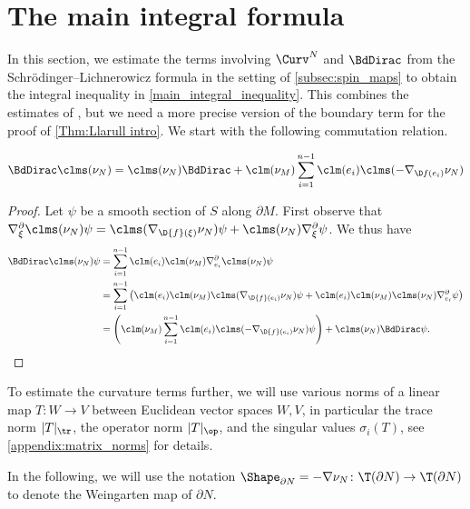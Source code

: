 \documentclass[a4paper,11pt]{amsart}
\numberwithin{equation}{section}
\begin{document}
\section{The main integral formula}\label{sec:integral_formula}

 
In this section, we estimate the terms involving \(\Curv^N\) and \(\BdDirac\) from the Schr\"odinger--Lichnerowicz formula  in the setting of \cref{subsec:spin_maps} to obtain the integral inequality in \cref{main_integral_inequality}.
This combines the estimates of \textcite{GoetteSemmelmann,listing2010scalar,Lott}, but we need a more precise version of the boundary term for the proof of \cref{Thm:Llarull intro}.
We start with the following commutation relation.

\begin{lemma} \label{boundary_dirac_commutation}
    \begin{equation*}
        \BdDirac \clms(\nu_N) = \clms(\nu_N) \BdDirac + \clm(\nu_M) \sum_{i=1}^{n-1} \clm(e_i) \clms(- \nabla_{\D f(e_i)} \nu_N) 
    \end{equation*}
\end{lemma}
\begin{proof}
    Let \(\psi\) be a smooth section of \(S\) along \(\partial M\).
    First observe that \(\nabla^\partial_{\xi} \clms(\nu_N) \psi = \clms(\nabla_{\D{f}(\xi)} \nu_N) \psi + \clms(\nu_N) \nabla^\partial_\xi \psi \).
    We thus have
    \begin{align*}
        \BdDirac \clms(\nu_N) \psi &= \sum_{i=1}^{n-1} \clm(e_i) \clm(\nu_M) \nabla_{e_i}^\partial \clms(\nu_N) \psi \\
        &= \sum_{i=1}^{n-1} \left( \clm(e_i) \clm(\nu_M) \clms(\nabla_{\D{f}(e_i)} \nu_N) \psi + \clm(e_i)\clm(\nu_M)\clms(\nu_N) \nabla^\partial_{e_i} \psi \right) \\
        &= \left(\clm(\nu_M)  \sum_{i=1}^{n-1} \clm(e_i) \clms(- \nabla_{\D{f}(e_i)} \nu_N) \psi \right) + \clms(\nu_N) \BdDirac \psi. \qedhere
    \end{align*}
\end{proof}

To estimate the curvature terms further, we will use various norms of a linear map \(T \colon W \to V\) between Euclidean vector spaces \(W,V\), in particular the trace norm \(|T|_{\tr}\), the operator norm \(|T|_\op\), and the singular values \(\sigma_i(T)\), see \cref{appendix:matrix_norms} for details.

In the following, we will use the notation \(\Shape_{\partial N} = - \nabla \nu_N \colon \T(\partial N) \to \T(\partial N)\) to denote the Weingarten map of \(\partial N\).
\end{document}

